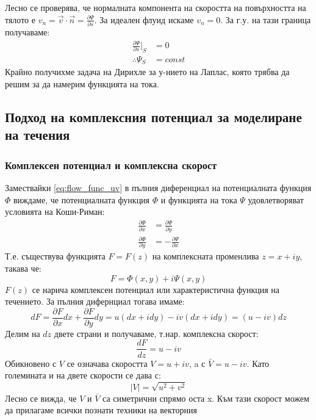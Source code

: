 Лесно се проверява, че нормалната компонента на скоростта на повърхността на тялото е $v_n = \vec{v} \cdot \vec{n} = \frac{\partial \Psi}{\partial s}$. За идеален флуид искаме $v_n =0$. За г.у. на тази граница получаваме:
\begin{align*}
	\frac{\partial \Psi}{\partial s}\big|_{S} & = 0     \\
	\therefore \Psi_S                         & = const
\end{align*}
Крайно получихме задача на Дирихле за у-нието на Лаплас, която трябва да решим за да намерим функцията на тока.
\subsection{Подход на комплексния потенциал за моделиране на течения}
\subsubsection{Комплексен потенциал и комплексна скорост}
Замествайки \autoref{eq:flow_func_uv} в пълния диференциал на потенциалната функция $\Phi$ виждаме, че потенциалната функция $\Phi$ и функцията на тока $\Psi$ удовлетворяват условията на Коши-Риман:
\begin{align*}
	\frac{\partial \Phi}{\partial x} & = \frac{\partial \Psi}{\partial y}  \\
	\frac{\partial \Phi}{\partial y} & = -\frac{\partial \Psi}{\partial x}
\end{align*}
Т.е. съществува функцията $F = F(z)$ на комплексната променлива $z = x + i y$, такава че:
\begin{equation*}
	F = \Phi(x,y) + i \Psi(x,y)
\end{equation*}
$F(z)$ се нарича комплексен потенциал или характеристична функция на течението. За пълния дифернциал тогава имаме:
\begin{equation*}
	dF = \frac{\partial F}{\partial x} dx + \frac{\partial F}{\partial y} dy = u (dx + i dy) - i v (dx + i dy) = (u-iv) dz
\end{equation*}
Делим на $dz$ двете страни и получаваме, т.нар. комплексна скорост:
\begin{equation*}
	\frac{dF}{dz} = u - i v
\end{equation*}
Обикновено с $V$ се означава скоростта $V = u + i v$, a с $\bar{V} = u - i v$. Като големината и на двете скорости се дава с:
\begin{equation*}
	|V| = \sqrt{u^2 + v^2}
\end{equation*}
Лесно се вижда, че $V$ и $\bar{V}$ са симетрични спрямо оста x. Към тази скорост можем да прилагаме всички познати техники на векторния
